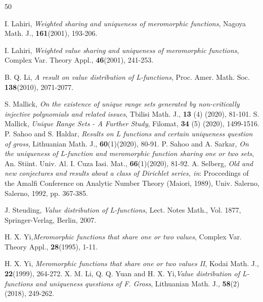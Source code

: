 \documentclass[a4paper,draft]{amsproc}
\theoremstyle{plain}
\theoremstyle{definition}
\theoremstyle{remark}
\numberwithin{equation}{section}
\begin{document}
\begin{thebibliography}{50}

 I. Lahiri, {\em Weighted sharing and uniqueness of meromorphic functions}, Nagoya Math. J., {\bf 161}(2001), 193-206.

 I. Lahiri, {\em Weighted value sharing and uniqueness of meromorphic functions}, Complex Var. Theory Appl., {\bf 46}(2001), 241-253.

B. Q. Li, {\em A result on value distribution of	L-functions}, Proc. Amer. Math. Soc. {\bf 138}(2010), 2071-2077.

 S. Mallick, {\em On the existence of unique range sets generated by
non-critically injective polynomials and related issues}, Tbilisi Math. J., {\bf 13} (4) (2020), 81-101.
 S. Mallick, {\em Unique Range Sets - A Further Study}, Filomat, {\bf 34} (5) (2020), 1499-1516.
 P. Sahoo and S. Haldar, {\em Results on L functions and certain uniqueness question of gross}, Lithuanian Math. J.,
{\bf 60}(1)(2020), 80-91.
 P. Sahoo and A. Sarkar, {\em On the uniqueness of L-function and meromorphic function sharing one or two
sets}, An. Stiint. Univ. Al. I. Cuza Iasi. Mat., {\bf66}(1)(2020), 81-92.
 A. Selberg, {\em Old and new conjectures and results about a class of Dirichlet series, in}: Proccedings of the Amalfi
Conference on Analytic Number Theory (Maiori, 1989), Univ. Salerno, Salerno, 1992, pp. 367-385.

 J. Steuding, {\em Value distribution of L-functions}, Lect. Notes Math., Vol. 1877, Springer-Verlag, Berlin, 2007.


  H. X. Yi,{\em Meromorphic functions that share one or two values},  Complex Var. Theory Appl., {\bf28}(1995), 1-11.

 H. X. Yi, {\em Meromorphic functions that share one or two values II}, Kodai Math. J., {\bf 22}(1999), 264-272.
X. M. Li, Q. Q. Yuan and H. X. Yi,{\em Value distribution of L-functions and uniqueness questions of F. Gross}, Lithuanian
Math. J., {\bf 58}(2)(2018), 249-262.


\end{thebibliography}
\end{document}
